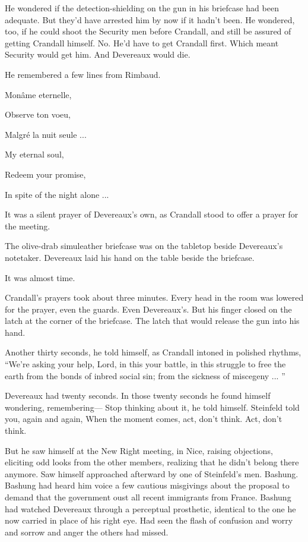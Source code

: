 He wondered if the detection-shielding on the gun in his briefcase had been adequate. But they'd have arrested him by now if it hadn't been. He wondered, too, if he could shoot the Security men before Crandall, and still be assured of getting Crandall himself. No. He'd have to get Crandall first. Which meant Security would get him. And Devereaux would die.

He remembered a few lines from Rimbaud.

Monâme eternelle,

Observe ton voeu,

Malgré la nuit seule ...

My eternal soul,

Redeem your promise,

In spite of the night alone ...

It was a silent prayer of Devereaux's own, as Crandall stood to offer a prayer for the meeting.

The olive-drab simuleather briefcase was on the tabletop beside Devereaux's notetaker. Devereaux laid his hand on the table beside the briefcase.

It was almost time.

Crandall's prayers took about three minutes. Every head in the room was lowered for the prayer, even the guards. Even Devereaux's. But his finger closed on the latch at the corner of the briefcase. The latch that would release the gun into his hand.

Another thirty seconds, he told himself, as Crandall intoned in polished rhythms, ``We're asking your help, Lord, in this your battle, in this struggle to free the earth from the bonds of inbred social sin; from the sickness of miscegeny ... ''

Devereaux had twenty seconds. In those twenty seconds he found himself wondering, remembering— Stop thinking about it, he told himself. Steinfeld told you, again and again, When the moment comes, act, don't think. Act, don't think.

But he saw himself at the New Right meeting, in Nice, raising objections, eliciting odd looks from the other members, realizing that he didn't belong there anymore. Saw himself approached afterward by one of Steinfeld's men. Bashung. Bashung had heard him voice a few cautious misgivings about the proposal to demand that the government oust all recent immigrants from France. Bashung had watched Devereaux through a perceptual prosthetic, identical to the one he now carried in place of his right eye. Had seen the flash of confusion and worry and sorrow and anger the others had missed.

